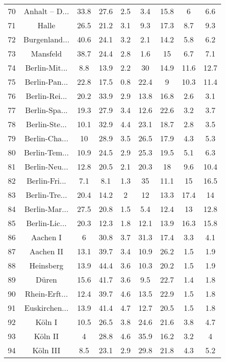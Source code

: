 \begin{table}[!htbp]
\begin{tabular}{@{\extracolsep{5pt}} ccccccccc}
70 & Anhalt – D... & 33.8 & 27.6 & 2.5 & 3.4 & 15.8 & 6 & 6.6 \\ 
71 & Halle & 26.5 & 21.2 & 3.1 & 9.3 & 17.3 & 8.7 & 9.3 \\ 
72 & Burgenland... & 40.6 & 24.1 & 3.2 & 2.1 & 14.2 & 5.8 & 6.2 \\ 
73 & Mansfeld & 38.7 & 24.4 & 2.8 & 1.6 & 15 & 6.7 & 7.1 \\ 
74 & Berlin-Mit... & 8.8 & 13.9 & 2.2 & 30 & 14.9 & 11.6 & 12.7 \\ 
75 & Berlin-Pan... & 22.8 & 17.5 & 0.8 & 22.4 & 9 & 10.3 & 11.4 \\ 
76 & Berlin-Rei... & 20.2 & 33.9 & 2.9 & 13.8 & 16.8 & 2.6 & 3.1 \\ 
77 & Berlin-Spa... & 19.3 & 27.9 & 3.4 & 12.6 & 22.6 & 3.2 & 3.7 \\ 
78 & Berlin-Ste... & 10.1 & 32.9 & 4.4 & 23.1 & 18.7 & 2.8 & 3.5 \\ 
79 & Berlin-Cha... & 10 & 28.9 & 3.5 & 26.5 & 17.9 & 4.3 & 5.3 \\ 
80 & Berlin-Tem... & 10.9 & 24.5 & 2.9 & 25.3 & 19.5 & 5.1 & 6.3 \\ 
81 & Berlin-Neu... & 12.8 & 20.5 & 2.1 & 20.3 & 18 & 9.6 & 10.4 \\ 
82 & Berlin-Fri... & 7.1 & 8.1 & 1.3 & 35 & 11.1 & 15 & 16.5 \\ 
83 & Berlin-Tre... & 20.4 & 14.2 & 2 & 12 & 13.3 & 17.4 & 14 \\ 
84 & Berlin-Mar... & 27.5 & 20.8 & 1.5 & 5.4 & 12.4 & 13 & 12.8 \\ 
85 & Berlin-Lic... & 20.3 & 12.3 & 1.8 & 12.1 & 13.9 & 16.3 & 15.8 \\ 
86 & Aachen I & 6 & 30.8 & 3.7 & 31.3 & 17.4 & 3.3 & 4.1 \\ 
87 & Aachen II & 13.1 & 39.7 & 3.4 & 10.9 & 26.2 & 1.5 & 1.9 \\ 
88 & Heinsberg & 13.9 & 44.4 & 3.6 & 10.3 & 20.2 & 1.5 & 1.9 \\ 
89 & Düren & 15.6 & 41.7 & 3.6 & 9.5 & 22.7 & 1.4 & 1.8 \\ 
90 & Rhein-Erft... & 12.4 & 39.7 & 4.6 & 13.5 & 22.9 & 1.5 & 1.8 \\ 
91 & Euskirchen... & 13.9 & 41.4 & 4.7 & 12.7 & 20.5 & 1.5 & 1.8 \\ 
92 & Köln I & 10.5 & 26.5 & 3.8 & 24.6 & 21.6 & 3.8 & 4.7 \\ 
93 & Köln II & 4 & 28.8 & 4.6 & 35.9 & 16.2 & 3.2 & 4 \\ 
94 & Köln III & 8.5 & 23.1 & 2.9 & 29.8 & 21.8 & 4.3 & 5.2 \\ 

\end{tabular}
\end{table}
